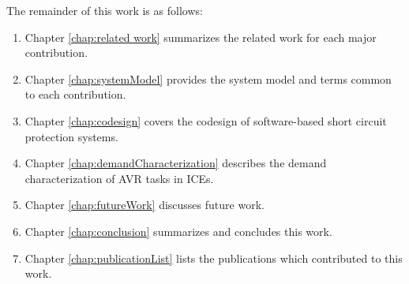 The remainder of this work is as follows:

\begin{enumerate}
    \item Chapter \ref{chap:related work} summarizes the related work for each major contribution.
    \item Chapter \ref{chap:systemModel} provides the system model and terms common to each contribution.
    \item Chapter \ref{chap:codesign} covers the codesign of software-based short circuit protection systems.
    \item Chapter \ref{chap:demandCharacterization} describes the demand characterization of AVR tasks in ICEs.
    \item Chapter \ref{chap:futureWork} discusses future work.
    \item Chapter \ref{chap:conclusion} summarizes and concludes this work.
    \item Chapter \ref{chap:publicationList} lists the publications which contributed to this work.
\end{enumerate}